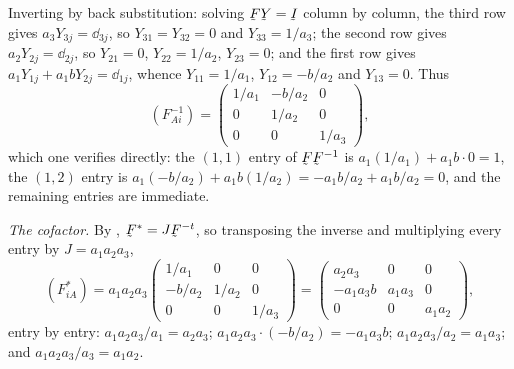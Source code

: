 \begin{solution}
Inverting by back substitution: solving $\bF\bY=\I$ column by column,
the third row gives $a_{3}Y_{3j}=\dd_{3j}$, so $Y_{31}=Y_{32}=0$ and
$Y_{33}=1/a_{3}$; the second row gives $a_{2}Y_{2j}=\dd_{2j}$, so
$Y_{21}=0$, $Y_{22}=1/a_{2}$, $Y_{23}=0$; and the first row gives
$a_{1}Y_{1j}+a_{1}bY_{2j}=\dd_{1j}$, whence $Y_{11}=1/a_{1}$,
$Y_{12}=-b/a_{2}$ and $Y_{13}=0$. Thus
\[
   (F^{-1}_{Ai})=\begin{pmatrix}1/a_{1}&-b/a_{2}&0\\
   0&1/a_{2}&0\\ 0&0&1/a_{3}\end{pmatrix},
\]
which one verifies directly: the $(1,1)$ entry of $\bF\bF^{-1}$ is
$a_{1}(1/a_{1})+a_{1}b\cdot0=1$, the $(1,2)$ entry is
$a_{1}(-b/a_{2})+a_{1}b(1/a_{2})=-a_{1}b/a_{2}+a_{1}b/a_{2}=0$, and
the remaining entries are immediate.

\medskip
\noindent\emph{The cofactor.}
By , $\bF^{*}=J\bF^{-t}$, so transposing the inverse and
multiplying every entry by $J=a_{1}a_{2}a_{3}$,
\[
   (F^{*}_{iA})=a_{1}a_{2}a_{3}\begin{pmatrix}1/a_{1}&0&0\\
   -b/a_{2}&1/a_{2}&0\\ 0&0&1/a_{3}\end{pmatrix}
   =\begin{pmatrix}a_{2}a_{3}&0&0\\
   -a_{1}a_{3}b&a_{1}a_{3}&0\\ 0&0&a_{1}a_{2}\end{pmatrix},
\]
entry by entry: $a_{1}a_{2}a_{3}/a_{1}=a_{2}a_{3}$;
$a_{1}a_{2}a_{3}\cdot(-b/a_{2})=-a_{1}a_{3}b$;
$a_{1}a_{2}a_{3}/a_{2}=a_{1}a_{3}$; and
$a_{1}a_{2}a_{3}/a_{3}=a_{1}a_{2}$.


\end{solution}
